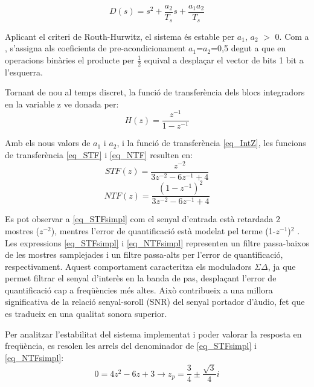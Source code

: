 \begin{equation}\label{eq_dentransf}
    D(s) = s^2 + \frac{a_2}{T_s} s + \frac{a_1 a_2}{T_s}
\end{equation}
\par Aplicant el criteri de Routh-Hurwitz, el sistema és estable per $a_1$, $a_2$ $>$ 0. Com a \cite{ADC16b}, s'assigna als coeficients de pre-acondicionament $a_1$=$a_2$=0,5 degut a que en operacions binàries el producte per $\frac{1}{2}$ equival a desplaçar el vector de bits 1 bit a l'esquerra.
\par Tornant de nou al temps discret, la funció de transferència dels blocs integradors en la variable z ve donada per:
\begin{equation}\label{eq_IntZ}
    H(z) = \frac{z^{-1}}{1 - z^{-1} }
\end{equation}
\par Amb els nous valors de $a_1$ i $a_2$, i la funció de transferència \ref{eq_IntZ}, les funcions de transferència \ref{eq_STF} i \ref{eq_NTF} resulten en: 
\begin{equation}\label{eq_STFsimpl}
    STF(z) = \frac{z^{-2}}{3z^{-2}-6z^{-1}+4}
\end{equation}
\begin{equation}\label{eq_NTFsimpl}
    NTF(z) = \frac{(1-z^{-1})^2}{3z^{-2}-6z^{-1}+4}
\end{equation}
\par Es pot observar a \ref{eq_STFsimpl} com el senyal d'entrada està retardada 2 mostres ($z^{-2}$), mentres l'error de quantificació està modelat pel terme (1-$z^{-1}$)$^2$ \cite{ADC16b}. Les expressions \ref{eq_STFsimpl} i \ref{eq_NTFsimpl} representen un filtre passa-baixos de les mostres samplejades i un filtre passa-alts per l'error de quantificació, respectivament. Aquest comportament caracteritza els moduladors $\Sigma \Delta$, ja que permet filtrar el senyal d'interès en la banda de pas, desplaçant l'error de quantificació cap a freqüències més altes. Això contribueix a una millora significativa de la relació senyal-soroll (SNR) del senyal portador d'àudio, fet que es tradueix en una qualitat sonora superior. 
\par Per analitzar l'estabilitat del sistema implementat i poder valorar la resposta en freqüència, es resolen les arrels del denominador de \ref{eq_STFsimpl} i \ref{eq_NTFsimpl}:
\begin{equation}\label{eq_polesSTF}
    0 = 4z^{2}-6z+3 \longrightarrow z_p = \frac{3}{4} \pm \frac{\sqrt{3}}{4}i
\end{equation}
